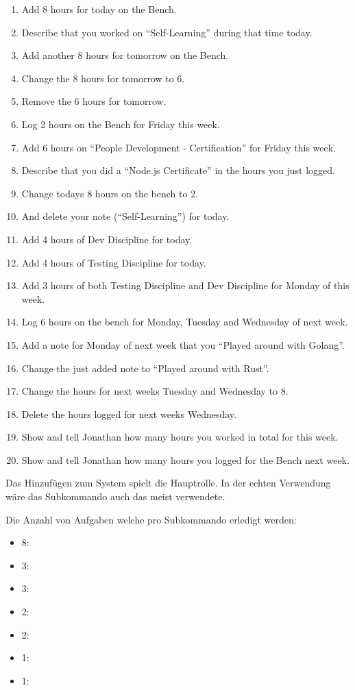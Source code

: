 \documentclass[oneside,bibliography=totocnumbered,BCOR=5mm]{scrbook}
\begin{document}
\begin{enumerate}
  \item Add 8 hours for today on the Bench.
  \item Describe that you worked on ``Self-Learning'' during that time today.
  \item Add another 8 hours for tomorrow on the Bench.
  \item Change the 8 hours for tomorrow to 6.
  \item Remove the 6 hours for tomorrow.
  \item Log 2 hours on the Bench for Friday this week.
  \item Add 6 hours on ``People Development - Certification'' for Friday this week.
  \item Describe that you did a ``Node.js Certificate'' in the hours you just logged.
  \item Change todays 8 hours on the bench to 2.
  \item And delete your note (``Self-Learning'') for today.
  \item Add 4 hours of Dev Discipline for today.
  \item Add 4 hours of Testing Discipline for today.
  \item Add 3 hours of both Testing Discipline and Dev Discipline for Monday of this week.
  \item Log 6 hours on the bench for Monday, Tuesday and Wednesday of next week.
  \item Add a note for Monday of next week that you ``Played around with Golang''.
  \item Change the just added note to ``Played around with Rust''.
  \item Change the hours for next weeks Tuesday and Wednesday to 8.
  \item Delete the hours logged for next weeks Wednesday.
  \item Show and tell Jonathan how many hours you worked in total for this week.
  \item Show and tell Jonathan how many hours you logged for the Bench next week.
\end{enumerate}

Das Hinzufügen zum System spielt die Hauptrolle. In der echten Verwendung wäre
das  Subkommando auch das meist verwendete.

\label{text:anzahl-aufgaben}
Die Anzahl von Aufgaben welche pro Subkommando erledigt werden:
\begin{itemize}
  \item 8: 
  \item 3: 
  \item 3: 
  \item 2: 
  \item 2: 
  \item 1: 
  \item 1: 
\end{itemize}
\end{document}

